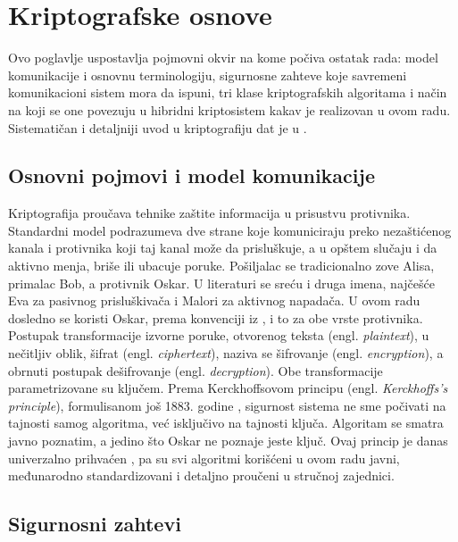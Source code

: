 \chapter{Kriptografske osnove}
\label{ch:osnove}

Ovo poglavlje uspostavlja pojmovni okvir na kome počiva ostatak rada: model komunikacije i osnovnu terminologiju, sigurnosne zahteve koje savremeni komunikacioni sistem mora da ispuni, tri klase kriptografskih algoritama i način na koji se one povezuju u hibridni kriptosistem kakav je realizovan u ovom radu. Sistematičan i detaljniji uvod u kriptografiju dat je u \cite{paar_pelzl, katz_lindell}.

\section{Osnovni pojmovi i model komunikacije}
\label{sec:osnovni_pojmovi}

Kriptografija proučava tehnike zaštite informacija u prisustvu protivnika. Standardni model podrazumeva dve strane koje komuniciraju preko nezaštićenog kanala i protivnika koji taj kanal može da prisluškuje, a u opštem slučaju i da aktivno menja, briše ili ubacuje poruke. Pošiljalac se tradicionalno zove Alisa, primalac Bob, a protivnik Oskar. U literaturi se sreću i druga imena, najčešće Eva za pasivnog prisluškivača i Malori za aktivnog napadača. U ovom radu dosledno se koristi Oskar, prema konvenciji iz \cite{paar_pelzl}, i to za obe vrste protivnika.
\smallbreak
Postupak transformacije izvorne poruke, otvorenog teksta (engl. \textit{plaintext}), u nečitljiv oblik, šifrat (engl. \textit{ciphertext}), naziva se šifrovanje (engl. \textit{encryption}), a obrnuti postupak dešifrovanje (engl. \textit{decryption}). Obe transformacije parametrizovane su ključem. Prema Kerckhoffsovom principu (engl. \textit{Kerckhoffs's principle}), formulisanom još 1883. godine \cite{kerckhoffs1883}, sigurnost sistema ne sme počivati na tajnosti samog algoritma, već isključivo na tajnosti ključa. Algoritam se smatra javno poznatim, a jedino što Oskar ne poznaje jeste ključ. Ovaj princip je danas univerzalno prihvaćen \cite{paar_pelzl}, pa su svi algoritmi korišćeni u ovom radu javni, međunarodno standardizovani i detaljno proučeni u stručnoj zajednici.

\section{Sigurnosni zahtevi}
\label{sec:sigurnosni_zahtevi}

